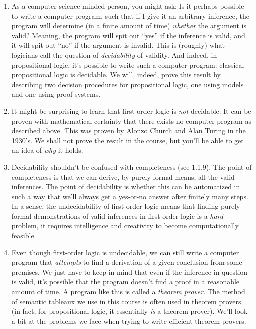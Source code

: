 	\begin{enumerate}[\thesection.1]

		\item As a computer science-minded person, you might ask: Is it perhaps possible to write a computer program, such that if I give it an arbitrary inference, the program will determine (in  a finite amount of time) \emph{whether} the argument is valid? Meaning, the program will spit out ``yes'' if the inference is valid, and it will spit out ``no'' if the argument is invalid. This is (roughly) what logicians call the question of \emph{decidability} of validity. And indeed, in propositional logic, it's possible to write such a computer program: classical propositional logic is decidable. We will, indeed, prove this result by describing two decision procedures for propositional logic, one using models and one using proof systems. 
		
		\item It might be surprising to learn that first-order logic is \emph{not} decidable. It can be proven with mathematical certainty that there exists no computer program as described above. This was proven by Alonzo Church and Alan Turing in the 1930's. We shall not prove the result in the course, but you'll be able to get an idea of \emph{why} it holds.
		
		\item Decidability shouldn't be confused with completeness (see 1.1.9). The point of completeness is that we can derive, by purely formal means, all the valid inferences. The point of decidability is whether this can be automatized in such a way that we'll always get a yes-or-no answer after finitely many steps. In a sense, the undecidability of first-order logic means that finding purely formal demonstrations of valid inferences in first-order logic is a \emph{hard} problem, it requires intelligence and creativity to become computationally feasible.
		 
		 \item Even though first-order logic is undecidable, we can still write a computer program that \emph{attempts} to find a derivation of a given conclusion from some premises. We just have to keep in mind that even if the inference in question is valid, it's possible that the program doesn't find a proof in a reasonable amount of time. A program like this is called a \emph{theorem prover}. The method of semantic tableaux we use in this course is often used in theorem provers (in fact, for propositional logic, it essentially \emph{is} a theorem prover). We'll look a bit at the problems we face when trying to write efficient theorem provers.
		 
	\end{enumerate}

